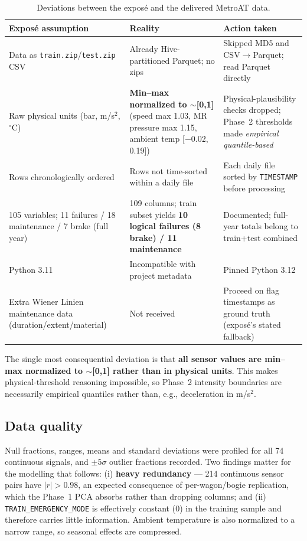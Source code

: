 \documentclass[11pt,a4paper]{article}
\begin{document}
\begin{table}[H]
\centering
\caption{Deviations between the exposé and the delivered MetroAT data.}
\label{tab:deviations}
\small
\begin{tabular}{p{4.4cm} p{5.2cm} p{4.6cm}}
\toprule
\textbf{Exposé assumption} & \textbf{Reality} & \textbf{Action taken}\\
\midrule
Data as \texttt{train.zip}/\texttt{test.zip} CSV &
Already Hive-partitioned Parquet; no zips &
Skipped MD5 and CSV$\rightarrow$Parquet; read Parquet directly\\[0.3em]
Raw physical units (bar, m/s$^2$, $^\circ$C) &
\textbf{Min--max normalized to $\sim$[0,1]} (speed max 1.03, MR pressure max 1.15,
ambient temp [$-0.02$, 0.19]) &
Physical-plausibility checks dropped; Phase~2 thresholds made \emph{empirical
quantile-based}\\[0.3em]
Rows chronologically ordered &
Rows not time-sorted within a daily file &
Each daily file sorted by \texttt{TIMESTAMP} before processing\\[0.3em]
105 variables; 11 failures / 18 maintenance / 7 brake (full year) &
109 columns; train subset yields \textbf{10 logical failures (8 brake) / 11 maintenance} &
Documented; full-year totals belong to train+test combined\\[0.3em]
Python 3.11 &
Incompatible with project metadata &
Pinned Python 3.12\\[0.3em]
Extra Wiener Linien maintenance data (duration/extent/material) &
Not received &
Proceed on flag timestamps as ground truth (exposé's stated fallback)\\
\bottomrule
\end{tabular}
\end{table}

The single most consequential deviation is that \textbf{all sensor values are min--max
normalized to $\sim$[0,1] rather than in physical units}. This makes physical-threshold
reasoning impossible, so Phase~2 intensity boundaries are necessarily empirical
quantiles rather than, e.g., deceleration in m/s$^2$.

\subsection{Data quality}
Null fractions, ranges, means and standard deviations were profiled for all 74
continuous signals, and $\pm5\sigma$ outlier fractions recorded. Two findings matter for
the modelling that follows: (i) \textbf{heavy redundancy} --- 214 continuous sensor pairs
have $|r|>0.98$, an expected consequence of per-wagon/bogie replication, which the
Phase~1 PCA absorbs rather than dropping columns; and (ii) \texttt{TRAIN\_EMERGENCY\_MODE}
is effectively constant ($0$) in the training sample and therefore carries little
information. Ambient temperature is also normalized to a narrow range, so seasonal
effects are compressed.
\end{document}
